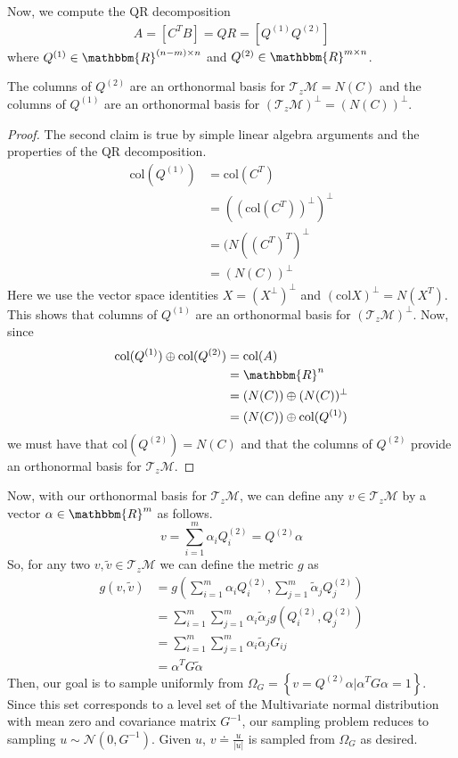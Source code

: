 Now, we compute the QR decomposition 
\begin{align}
        A = \left[C^T B\right] = QR = \left[Q^{(1)} Q^{(2)}\right]
\end{align}
where $Q^{(1)} \in \mathbbm{R}^{(n-m)\times n}$ and $ Q^{(2)} \in \mathbbm{R}^{m\times n}$.
\begin{mythm}
The columns of $Q^{(2)}$ are an orthonormal basis for $\mathcal{T}_z\mathcal{M} = N(C)$ and the columns of $Q^{(1)}$ are an orthonormal basis for $(\mathcal{T}_z\mathcal{M})^\perp = (N(C))^\perp$.
\end{mythm}
\begin{proof}
The second claim is true by simple linear algebra arguments and the properties of the QR decomposition.
\begin{align}
        \text{col} (Q^{(1)}) &= \text{col}(C^T)\\
        &= ((\text{col}(C^T))^\perp)^\perp\\
        &= (N((C^T)^T)^\perp \\ 
        &= (N(C))^\perp
\end{align}
Here we use the vector space identities $X = (X^\perp)^\perp$ and $(\text{col} X)^\perp = N(X^T)$. This shows that columns of $Q^{(1)}$ are an orthonormal basis for $(\mathcal{T}_z\mathcal{M})^\perp$. Now, since 
\begin{align}
        \text{col} (Q^{(1)}) \oplus \text{col} (Q^{(2)}) &= \text{col}(A) \\
        &= \mathbbm{R}^n \\
        & = (N(C)) \oplus (N(C))^\perp \\
        & = (N(C)) \oplus \text{col} (Q^{(1)})
\end{align}
 we must have that $\text{col}(Q^{(2)}) = N(C)$ and that the columns of $Q^{(2)}$ provide an orthonormal basis for $\mathcal{T}_z\mathcal{M}$.
\end{proof}
Now, with our orthonormal basis for $\mathcal{T}_z\mathcal{M}$, we can define any $v \in \mathcal{T}_z\mathcal{M}$ by a vector $\alpha \in\mathbbm{R}^m$ as follows.
$$v = \sum_{i=1}^m \alpha_iQ^{(2)}_i = Q^{(2)}\alpha$$
So, for any two $v,\tilde{v} \in \mathcal{T}_z\mathcal{M}$ we can define the metric $g$ as
\begin{align}
        g(v,\tilde{v}) &= g\left(\sum_{i=1}^m \alpha_iQ^{(2)}_i, \sum_{j=1}^m \tilde{\alpha}_jQ^{(2)}_j\right) \\
        &= \sum_{i=1}^m\sum_{j=1}^m  \alpha_i \tilde{\alpha}_j g\left(Q^{(2)}_i, Q^{(2)}_j\right) \\
        &= \sum_{i=1}^m\sum_{j=1}^m  \alpha_i \tilde{\alpha}_j G_{ij} \\
        &= \alpha^T  G\tilde{\alpha}
\end{align}
Then, our goal is to sample uniformly from $\Omega_G = \left\{v = Q^{(2)}\alpha | \alpha^T G\alpha = 1\right\}$. Since this set corresponds to a level set of the Multivariate normal distribution with mean zero and covariance matrix $G^{-1}$, our sampling problem reduces to sampling $u \sim \mathcal{N}(0,G^{-1})$. Given $u$, $v \doteq \frac{u}{|u|}$ is sampled from $\Omega_G$ as desired.

